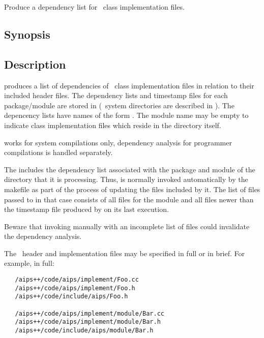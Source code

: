 Produce a dependency list for \aipspp\ class implementation files.

\subsection*{Synopsis}

\begin{synopsis}
\end{synopsis}

\subsection*{Description}

 produces a list of dependencies of \aipspp\ class implementation
files in relation to their included header files.  The dependency lists and
timestamp files for each package/module are stored in 
(\aipspp\ system directories are described in ).  The
depencency lists have names of the form
.  The module name may be empty to
indicate class implementation files which reside in the 
directory itself.

 works for system compilations only, dependency analysis for
programmer compilations is handled separately.

The   includes the dependency
list associated with the package and module of the directory that it is
processing.  Thus,  is normally invoked automatically by the
 makefile as part of the process of updating the files
included by it.  The list of files passed to  in that case
consists of all  files for the module and all  files newer
than the  timestamp file produced by  on its last
execution.

Beware that invoking  manually with an incomplete list of files
could invalidate the dependency analysis.

The \cplusplus\ header and implementation files may be specified in full or
in brief.  For example, in full:

\begin{verbatim}
   /aips++/code/aips/implement/Foo.cc
   /aips++/code/aips/implement/Foo.h
   /aips++/code/include/aips/Foo.h

   /aips++/code/aips/implement/module/Bar.cc
   /aips++/code/aips/implement/module/Bar.h
   /aips++/code/include/aips/module/Bar.h
\end{verbatim}

